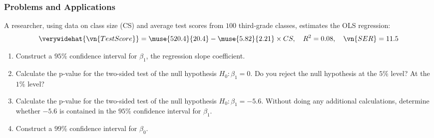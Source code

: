 

\begin{frame}
\frametitle{Problems and Applications}
A researcher, using data on class size (CS) and average test scores from $100$ third-grade classes, estimates the OLS regression:
\begin{align*}
\verywidehat{\vn{TestScore}} 
  = \muse{520.4}{20.4} - \muse{5.82}{2.21} \times CS,
  \quad R^2 = 0.08,
  \quad \vn{SER} = 11.5
\end{align*}
\vspace*{-2ex}
\begin{enumerate}
\item Construct a $95\%$ confidence interval for $\beta_1$, the regression slope coefficient.
\item Calculate the p-value for the two-sided test of the null hypothesis
$H_0\colon \beta_1 = 0$. Do you reject the null hypothesis at the $5\%$ level? At the $1\%$ level?
\item Calculate the p-value for the two-sided test of the null hypothesis 
$H_0\colon \beta_1=-5.6$. Without doing any additional calculations, determine whether $-5.6$ is contained in the $95\%$ confidence interval for $\beta_1$.
\item Construct a $99\%$ confidence interval for $\beta_0$.
\end{enumerate}
\end{frame}

